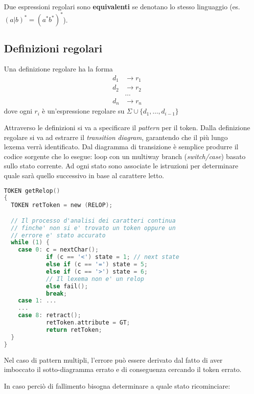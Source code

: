 Due espressioni regolari sono \textbf{equivalenti} se denotano lo stesso
linguaggio (es. $(a|b)^* = (a^*b^*)^*$).

\subsection{Definizioni regolari}
\label{sec:definizioni_regolari}
\begin{definition}
Una definizione regolare ha la forma
\begin{align*}
d_1 &\to r_1 \\
d_2 &\to r_2 \\
& \dots       \\
d_n &\to r_n
\end{align*}
dove ogni $r_i$ è un'espressione regolare su $\Sigma \cup
\{d_1, \dots, d_{i-1}\}$
\end{definition}

Attraverso le definizioni si va a specificare il \textit{pattern} per il token.
Dalla definizione regolare si va ad estrarre il \textit{transition diagram},
garantendo che il più lungo lexema verrà identificato. Dal diagramma di
transizione è semplice produrre il codice sorgente che lo esegue: loop con un
multiway branch (\textit{switch/case}) basato sullo stato corrente. Ad ogni
stato sono associate le istruzioni per determinare quale sarà quello successivo
in base al carattere letto.

\begin{lstlisting}[caption=Codice esempio diagramma di transizione, language=C]
TOKEN getRelop()
{
  TOKEN retToken = new (RELOP);

  // Il processo d'analisi dei caratteri continua
  // finche' non si e' trovato un token oppure un
  // errore e' stato accurato
  while (1) {
    case 0: c = nextChar();
            if (c == '<') state = 1; // next state
            else if (c == '=') state = 5;
            else if (c == '>') state = 6;
            // Il lexema non e' un relop
            else fail();
            break;
    case 1: ...
    ...
    case 8: retract();
            retToken.attribute = GT;
            return retToken;
  }
}
\end{lstlisting}

Nel caso di pattern multipli, l'errore può essere derivato dal fatto di aver
imboccato il sotto-diagramma errato e di conseguenza cercando il token errato.

In caso perciò di fallimento bisogna determinare a quale stato ricominciare:

